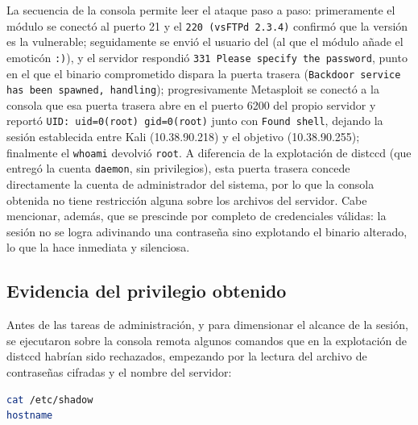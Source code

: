 \begin{analisis}
La secuencia de la consola permite leer el ataque paso a paso: primeramente el módulo se conectó al puerto 21 y el  \texttt{220 (vsFTPd 2.3.4)} confirmó que la versión es la vulnerable; seguidamente se envió el usuario del  (al que el módulo añade el emoticón \texttt{:)}), y el servidor respondió \texttt{331 Please specify the password}, punto en el que el binario comprometido dispara la puerta trasera (\texttt{Backdoor service has been spawned, handling}); progresivamente Metasploit se conectó a la consola que esa puerta trasera abre en el puerto 6200 del propio servidor y reportó \texttt{UID: uid=0(root) gid=0(root)} junto con \texttt{Found shell}, dejando la sesión establecida entre Kali (10.38.90.218) y el objetivo (10.38.90.255); finalmente el \texttt{whoami} devolvió \texttt{root}. A diferencia de la explotación de distccd (que entregó la cuenta \texttt{daemon}, sin privilegios), esta puerta trasera concede directamente la cuenta de administrador del sistema, por lo que la consola obtenida no tiene restricción alguna sobre los archivos del servidor. Cabe mencionar, además, que se prescinde por completo de credenciales válidas: la sesión no se logra adivinando una contraseña sino explotando el binario alterado, lo que la hace inmediata y silenciosa.
\end{analisis}

\subsection{Evidencia del privilegio obtenido}

Antes de las tareas de administración, y para dimensionar el alcance de la sesión, se ejecutaron sobre la consola remota algunos comandos que en la explotación de distccd habrían sido rechazados, empezando por la lectura del archivo de contraseñas cifradas y el nombre del servidor:

\begin{lstlisting}[language=bash]
cat /etc/shadow
hostname
\end{lstlisting}


